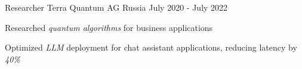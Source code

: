 \begin{cventries}
  \cventry
    {Researcher} %
    {Terra Quantum AG} %
    {Russia} %
    {July 2020 - July 2022} %
    {
      \begin{cvitems} %
        \item { Researched \textit{quantum algorithms} for business applications }
        \item { Optimized \textit{LLM} deployment for chat assistant applications, reducing latency by \textit{40\%} }
      \end{cvitems}
    }
    
\end{cventries}
